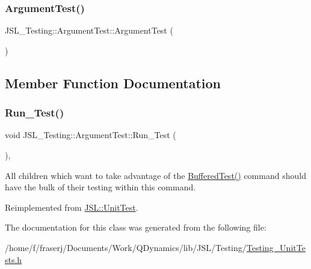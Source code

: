 \subsubsection{\texorpdfstring{Argument\+Test()}{ArgumentTest()}}
{\footnotesize\ttfamily J\+S\+L\+\_\+\+Testing\+::\+Argument\+Test\+::\+Argument\+Test (\begin{DoxyParamCaption}{ }\end{DoxyParamCaption})\hspace{0.3cm}{\ttfamily [inline]}}



\subsection{Member Function Documentation}
\mbox{\label{classJSL__Testing_1_1ArgumentTest_a1c4c626d57e448da86866ef414308e97}} 
\subsubsection{\texorpdfstring{Run\+\_\+\+Test()}{Run\_Test()}}
{\footnotesize\ttfamily void J\+S\+L\+\_\+\+Testing\+::\+Argument\+Test\+::\+Run\+\_\+\+Test (\begin{DoxyParamCaption}{ }\end{DoxyParamCaption})\hspace{0.3cm}{\ttfamily [inline]}, {\ttfamily [virtual]}}



All children which want to take advantage of the \hyperlink{classJSL_1_1UnitTest_aabec19b081be8a428f12e4b5e3dc2a9c}{Buffered\+Test()} command should have the bulk of their testing within this command. 



Reimplemented from \hyperlink{classJSL_1_1UnitTest_aa8369ab1ce2a537bff2ea7e1c8818490}{J\+S\+L\+::\+Unit\+Test}.



The documentation for this class was generated from the following file\+:\begin{DoxyCompactItemize}
\item 
/home/f/fraserj/\+Documents/\+Work/\+Q\+Dynamics/lib/\+J\+S\+L/\+Testing/\hyperlink{Testing__UnitTests_8h}{Testing\+\_\+\+Unit\+Tests.\+h}\end{DoxyCompactItemize}
